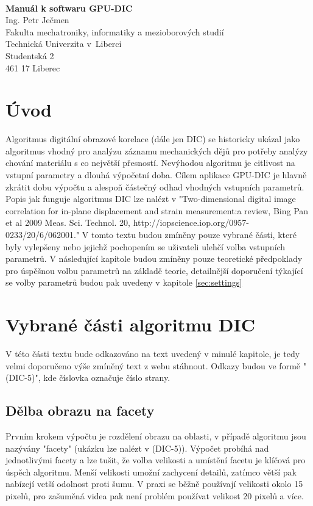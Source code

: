 \documentclass[a4paper,12pt]{article}
\date{September 13, 2013}
\begin{document}
\listoftodos
\newpage
\logo
\\\vspace{6pt}
\begin{center}
\large{\bfseries Manuál k softwaru GPU-DIC}
\\\vspace{1pc}
\small{
Ing. Petr Ječmen
\\\vspace{1pc}
Fakulta mechatroniky, informatiky a mezioborových studií\\
Technická Univerzita v~Liberci\\
Studentská 2\\
461 17 Liberec}
\end{center}
\newpage
\section{Úvod}
Algoritmus digitální obrazové korelace (dále jen DIC) se historicky ukázal jako algoritmus vhodný pro analýzu záznamu mechanických dějů pro potřeby analýzy chování materiálu s co největší přesností. Nevýhodou algoritmu je citlivost na vstupní parametry a dlouhá výpočetní doba. Cílem aplikace GPU-DIC je  hlavně zkrátit dobu výpočtu a alespoň částečný odhad vhodných vstupních parametrů.
Popis jak funguje algoritmus DIC lze nalézt v "Two-dimensional digital image correlation for in-plane displacement and strain measurement:a review, Bing Pan et al 2009 Meas. Sci. Technol. 20, http://iopscience.iop.org/0957-0233/20/6/062001." V tomto textu budou zmíněny pouze vybrané části, které byly vylepšeny nebo jejichž pochopením se uživateli ulehčí volba vstupních parametrů. V následující kapitole budou zmíněny pouze teoretické předpoklady pro úspěšnou volbu parametrů na základě teorie, detailnější doporučení týkající se volby parametrů budou pak uvedeny v kapitole \ref{sec:settings}
\newpage
\section{Vybrané části algoritmu DIC}
V této části textu bude odkazováno na text uvedený v minulé kapitole, je tedy velmi doporučeno výše zmíněný text z webu stáhnout. Odkazy budou ve formě "(DIC-5)", kde číslovka označuje číslo strany.
\subsection{Dělba obrazu na facety}
Prvním krokem výpočtu je rozdělení obrazu na oblasti, v případě algoritmu jsou nazývány "facety" (ukázku lze nalézt v (DIC-5)). Výpočet probíhá nad jednotlivými facety a lze tušit, že volba velikosti a umístění facetu je klíčová pro úspěch algoritmu. Menší velikosti umožní zachycení detailů, zatímco větší pak nabízejí vetší odolnost proti šumu. V praxi se běžně používají velikosti okolo 15 pixelů, pro zašuměná videa pak není problém používat velikost 20 pixelů a více.
\end{document}
